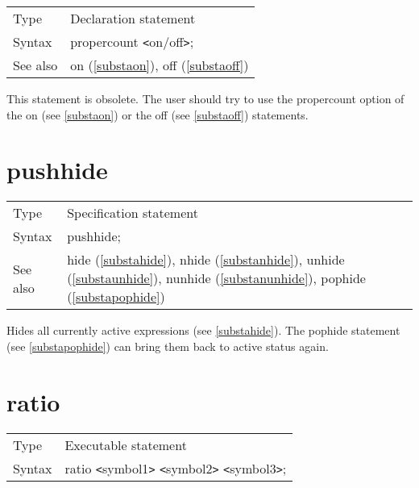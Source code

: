 \noindent \begin{tabular}{ll}
Type & Declaration statement\\
Syntax & propercount {\tt<}on/off{\tt>};
\\ See also & on (\ref{substaon}), off (\ref{substaoff})
\end{tabular} \vspace{4mm}

\noindent This statement is obsolete. 
The user should try to use the propercount option of the on (see 
\ref{substaon}) or the off (see \ref{substaoff}) statements. 
\vspace{10mm}


\section{pushhide}
\label{substapushhide}

\noindent \begin{tabular}{ll}
Type & Specification statement\\
Syntax & pushhide;
\\ See also & hide (\ref{substahide}),
              nhide (\ref{substanhide}),
              unhide (\ref{substaunhide}),
              nunhide (\ref{substanunhide}),
              pophide (\ref{substapophide})
\end{tabular} \vspace{4mm}

\noindent Hides all currently active 
expressions (see \ref{substahide}). The pophide statement 
(see \ref{substapophide}) can bring them back to active status again. 
\vspace{10mm}

 
\section{ratio}
\label{substaratio}

\noindent \begin{tabular}{ll}
Type & Executable statement\\
Syntax & ratio {\tt<}symbol1{\tt>} {\tt<}symbol2{\tt>} {\tt<}symbol3{\tt>};
\end{tabular} \vspace{4mm}

